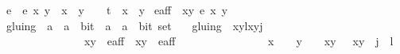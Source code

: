 \begin{isabellebody}
\isanewline
{}\isamarkupfalse%
\ e{\isacharprime}\ \ {\isachardoublequoteopen}e{\isacharprime}\ x\ y\ {\isacharequal}\ x{\isacharcircum}{}\ {\isacharplus}\ y{\isacharcircum}{}\ {\isacharminus}\ {}\ {\isacharminus}\ t{\isacharcircum}{}\ {\isacharasterisk}\ x{\isacharcircum}{}\ {\isacharasterisk}\ y{\isacharcircum}{}{\isachardoublequoteclose}\isanewline
\isanewline
{}\isamarkupfalse%
\ {\isachardoublequoteopen}e{\isacharprime}{\isacharunderscore}aff\ {\isacharequal}\ {\isacharbraceleft}{\isacharparenleft}x{\isacharcomma}y{\isacharparenright}{\isachardot}\ e{\isacharprime}\ x\ y\ {\isacharequal}\ {}{\isacharbraceright}{\isachardoublequoteclose}\ \isanewline
\isanewline
{}\isamarkupfalse%
\ gluing\ {\isacharcolon}{\isacharcolon}\ {\isachardoublequoteopen}{\isacharparenleft}{\isacharparenleft}{\isacharparenleft}{\isacharprime}a\ {\isasymtimes}\ {\isacharprime}a{\isacharparenright}\ {\isasymtimes}\ bit{\isacharparenright}\ {\isasymtimes}\ {\isacharparenleft}{\isacharparenleft}{\isacharprime}a\ {\isasymtimes}\ {\isacharprime}a{\isacharparenright}\ {\isasymtimes}\ bit{\isacharparenright}{\isacharparenright}\ set{\isachardoublequoteclose}\ \isanewline
\ \ {\isachardoublequoteopen}gluing\ {\isacharequal}\ {\isacharbraceleft}{\isacharparenleft}{\isacharparenleft}{\isacharparenleft}x{}{\isacharcomma}y{}{\isacharparenright}{\isacharcomma}l{\isacharparenright}{\isacharcomma}{\isacharparenleft}{\isacharparenleft}x{}{\isacharcomma}y{}{\isacharparenright}{\isacharcomma}j{\isacharparenright}{\isacharparenright}{\isachardot}\ \isanewline
\ \ \ \ \ \ \ \ \ \ \ \ \ \ \ {\isacharparenleft}{\isacharparenleft}x{}{\isacharcomma}y{}{\isacharparenright}\ {\isasymin}\ e{\isacharprime}{\isacharunderscore}aff\ {\isasymand}\ {\isacharparenleft}x{}{\isacharcomma}y{}{\isacharparenright}\ {\isasymin}\ e{\isacharprime}{\isacharunderscore}aff{\isacharparenright}\ {\isasymand}\isanewline
\ \ \ \ \ \ \ \ \ \ \ \ \ \ \ {\isacharparenleft}{\isacharparenleft}x{}\ {\isasymnoteq}\ {}\ {\isasymand}\ y{}\ {\isasymnoteq}\ {}\ {\isasymand}\ {\isacharparenleft}x{}{\isacharcomma}y{}{\isacharparenright}\ {\isacharequal}\ {\isasymtau}\ {\isacharparenleft}x{}{\isacharcomma}y{}{\isacharparenright}\ {\isasymand}\ j\ {\isacharequal}\ l{\isacharplus}{}{\isacharparenright}\ {\isasymor}\isanewline

\end{isabellebody}
